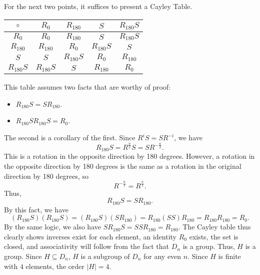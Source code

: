 \documentclass[11pt, letterpaper]{report}
\renewenvironment{solution}[1][]{\begin{setsolution}}{\end{setsolution}}
\begin{document}
\begin{solution}
	For the next two points, it suffices to present a Cayley Table.
	\begin{center}
		\begin{tabular}{c|cccc}
			$\circ $ &$R_{0}$ &$R_{180}$ &$S$ &$R_{180}S$ \\
			\hline
			$R_0$ &$R_{0}$&$R_{180}$&$S$&$R_{180}S$\\
			$R_{180}$ &$R_{180}$&$R_0$&$R_{180}S$&$S$\\
			$S$ &$S$&$R_{180}S$&$R_0$&$R_{180}$\\
			$R_{180}S$ &$R_{180}S$&$S$&$R_{180}$&$R_0$
		\end{tabular}
	\end{center}
	This table assumes two facts that are worthy of proof:
	\begin{itemize}
		\item $R_{180}S=SR_{180}$.
		\item $R_{180}SR_{180}S=R_0$.
	\end{itemize}
	The second is a corollary of the first. Since $R^{i}S=SR^{-i}$, we have
	\[
		R_{180}S=R^{\frac{n}{2}}S=SR^{-\frac{n}{2}}
	.\]
	This is a rotation in the opposite direction by 180 degrees. However, a rotation in the opposite direction by 180 degrees is the same as a rotation in the original direction by 180 degrees, so
	\[
		R^{-\frac{n}{2}}=R^{\frac{n}{2}}
	.\]
	Thus,
	\[
		R_{180}S=SR_{180}
	.\]
	By this fact, we have
	\[
		(R_{180}S)(R_{180}S)=\left( R_{180}S \right) \left( SR_{180} \right) =R_{180}(SS)R_{180}=R_{180}R_{180}=R_0
	.\]
	By the same logic, we also have $SR_{180}S=SSR_{180}=R_{180}$.
	The Cayley table thus clearly shows inverses exist for each element, an identity $R_0$ exists, the set is closed, and associativity will follow from the fact that $D_n$ is a group. Thus, $H$ is a group. Since $H\subseteq D_n$, $H$ is a subgroup of $D_n$ for any even $n$. Since $H$ is finite with $4$ elements, the order $\left| H \right| =4$.
\end{solution}
\end{document}
